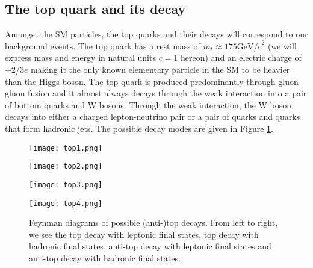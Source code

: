 \subsection{The top quark and its decay}
Amongst the SM particles, the top quarks and their decays will correspond to our background events. The top quark has a rest mass of $m_t\approx175\text{GeV/c}^2$ (we will express mass and energy in natural units $c=1$ hereon) and an electric charge of +2/3$e$ \cite{tanabashi2018review} making it the only known elementary particle in the SM to be heavier than the Higgs boson. The top quark is produced predominantly through gluon-gluon fusion and it almost always decays through the weak interaction into a pair of bottom quarks and W bosons. Through the weak interaction, the W boson decays into either a charged lepton-neutrino pair or a pair of quarks and quarks that form hadronic jets. The possible decay modes are given in Figure \ref{fig:topdecay}. \\


\begin{figure}[htbp]
    \centering
    \begin{minipage}{0.24\linewidth}
        \texttt{[image: top1.png]}
        \label{fig:top1}
    \end{minipage}
    \begin{minipage}{0.24\linewidth}
        \texttt{[image: top2.png]}
        \label{fig:anttop1}
    \end{minipage}
    \begin{minipage}{0.24\linewidth}
        \texttt{[image: top3.png]}
        \label{fig:top2}
    \end{minipage}
    \begin{minipage}{0.24\linewidth}
        \texttt{[image: top4.png]}
        \label{fig:anttop2}
    \end{minipage}
    \caption{Feynman diagrams of possible (anti-)top decays. From left to right, we see the top decay with leptonic final states, top decay with hadronic final states, anti-top decay with leptonic final states and anti-top decay with hadronic final states.}
    \label{fig:topdecay}
\end{figure}

